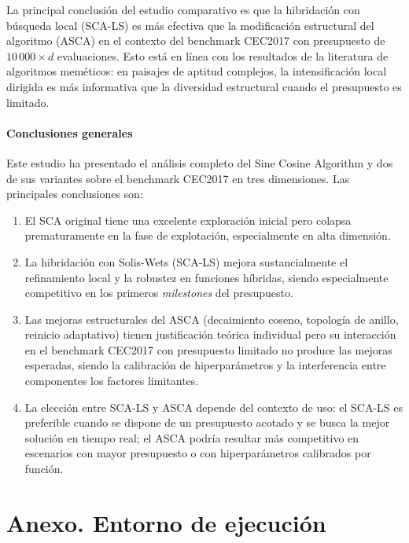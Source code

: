 \documentclass[12pt,a4paper]{article}
\begin{document}
La principal conclusión del estudio comparativo es que {la hibridación con búsqueda local (SCA-LS) es más efectiva que la modificación estructural del algoritmo (ASCA)} en el contexto del benchmark CEC2017 con presupuesto de $10\,000 \times d$ evaluaciones. Esto está en línea con los resultados de la literatura de algoritmos meméticos: en paisajes de aptitud complejos, la intensificación local dirigida es más informativa que la diversidad estructural cuando el presupuesto es limitado.
 
\subsection{Conclusiones generales}
 
Este estudio ha presentado el análisis completo del Sine Cosine Algorithm y dos de sus variantes sobre el benchmark CEC2017 en tres dimensiones. Las principales conclusiones son:
 
\begin{enumerate}
  \item El SCA original tiene una excelente exploración inicial pero colapsa prematuramente en la fase de explotación, especialmente en alta dimensión.
  \item La hibridación con Solis-Wets (SCA-LS) mejora sustancialmente el refinamiento local y la robustez en funciones híbridas, siendo especialmente competitivo en los primeros \textit{milestones} del presupuesto.
  \item Las mejoras estructurales del ASCA (decaimiento coseno, topología de anillo, reinicio adaptativo) tienen justificación teórica individual pero su interacción en el benchmark CEC2017 con presupuesto limitado no produce las mejoras esperadas, siendo la calibración de hiperparámetros y la interferencia entre componentes los factores limitantes.
  \item La elección entre SCA-LS y ASCA depende del contexto de uso: el SCA-LS es preferible cuando se dispone de un presupuesto acotado y se busca la mejor solución en tiempo real; el ASCA podría resultar más competitivo en escenarios con mayor presupuesto o con hiperparámetros calibrados por función.
\end{enumerate}

\clearpage
\part{Anexo. Entorno de ejecución}
\end{document}
